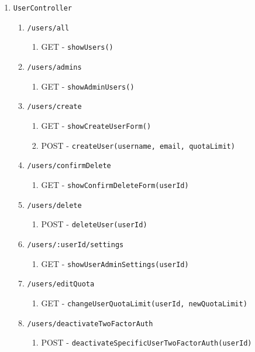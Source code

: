 \documentclass[12pt,DIV14,BCOR10mm,a4paper,parskip=half-,headsepline,headinclude,english,ngerman,bibliography=totocnumbered]{scrreprt}
\begin{document}
\begin{enumerate}
\begin{enumerate}
    \item \texttt{UserController}
    \begin{enumerate}
      \item \texttt{/users/all}
      \begin{enumerate}
        \item GET - \texttt{showUsers()}
      \end{enumerate}
      \item \texttt{/users/admins}
      \begin{enumerate}
        \item GET - \texttt{showAdminUsers()}
      \end{enumerate}
      \item \texttt{/users/create}
      \begin{enumerate}
        \item GET - \texttt{showCreateUserForm()}
        \item POST - \texttt{createUser(username, email, quotaLimit)}
      \end{enumerate}
      \item \texttt{/users/confirmDelete}
      \begin{enumerate}
        \item GET - \texttt{showConfirmDeleteForm(userId)}
      \end{enumerate}
      \item \texttt{/users/delete}
      \begin{enumerate}
        \item POST - \texttt{deleteUser(userId)}
      \end{enumerate}
      \item \texttt{/users/:userId/settings}
      \begin{enumerate}
        \item GET - \texttt{showUserAdminSettings(userId)}
      \end{enumerate}
      \item \texttt{/users/editQuota}
      \begin{enumerate}
        \item GET - \texttt{changeUserQuotaLimit(userId,
        newQuotaLimit)}
      \end{enumerate}
      \item \texttt{/users/deactivateTwoFactorAuth}
      \begin{enumerate}
        \item POST - \texttt{deactivateSpecificUserTwoFactorAuth(userId)}
      \end{enumerate}


\end{enumerate}
\end{enumerate}
\end{enumerate}
\end{document}

